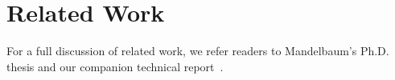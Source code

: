\section{Related Work}
\label{sec:related}

For a full discussion of related work, we refer readers to
Mandelbaum's Ph.D. thesis\cite{mandelbaum-thesis} and our companion
technical report~\cite{fisher+:popl-sub-long}.

